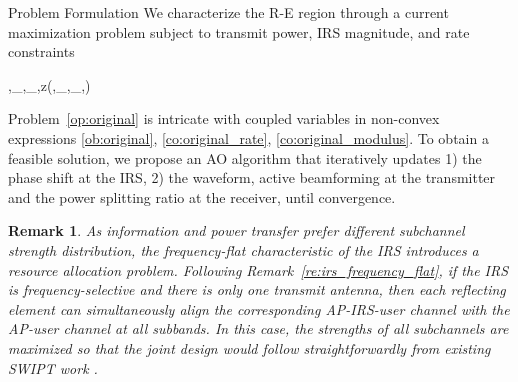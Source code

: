 \documentclass[journal]{IEEEtran}
\newtheorem{remark}{Remark}
\begin{document}
	\begin{section}{Problem Formulation}\label{se:problem_formulation}
		We characterize the R-E region through a current maximization problem subject to transmit power, IRS magnitude, and rate constraints
		\begin{maxi!}
			{\boldsymbol{\phi},_{},_{},\rho}{z(\boldsymbol{\phi},_{},_{},\rho)}{\label{op:original}}{\label{ob:original}}
			\label{co:original_power}
			\label{co:original_rate}
			\label{co:original_modulus}
		\end{maxi!}
		Problem~\eqref{op:original} is intricate with coupled variables in non-convex expressions \eqref{ob:original}, \eqref{co:original_rate}, \eqref{co:original_modulus}. To obtain a feasible solution, we propose an AO algorithm that iteratively updates 1) the phase shift at the IRS, 2) the waveform, active beamforming at the transmitter and the power splitting ratio at the receiver, until convergence.
		\begin{remark}\label{re:irs_subchannel_alignment}
			As information and power transfer prefer different subchannel strength distribution, the frequency-flat characteristic of the IRS introduces a resource allocation problem. Following Remark~\ref{re:irs_frequency_flat}, if the IRS is frequency-selective and there is only one transmit antenna, then each reflecting element can simultaneously align the corresponding AP-IRS-user channel with the AP-user channel at all subbands. In this case, the strengths of all subchannels are maximized so that the joint design would follow straightforwardly from existing SWIPT work \cite{Clerckx2018b}.
		\end{remark}



\end{section}
\end{document}
